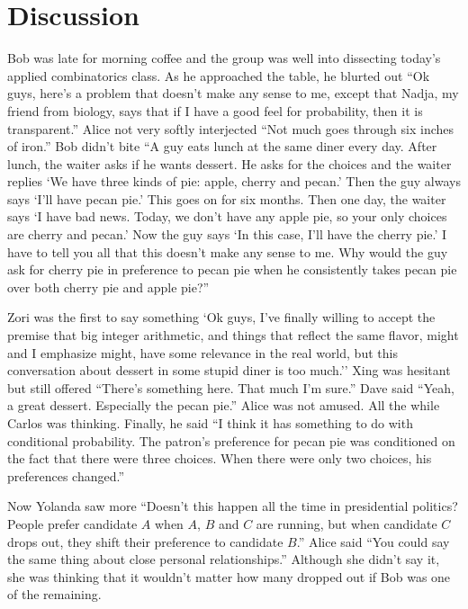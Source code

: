 \section{Discussion}

Bob was late for morning coffee and the group was
well into dissecting today's applied combinatorics class.
As he approached the table, he blurted out
``Ok guys, here's a problem that doesn't make any sense to
me, except that Nadja, my friend from biology, says that if I 
have a good feel for probability, then it is transparent.'' Alice not very
softly interjected ``Not much goes through six inches
of iron.'' Bob didn't bite ``A guy eats lunch
at the same diner every day.  After lunch, the waiter asks
if he wants dessert.  He asks for the choices and the waiter
replies `We have three kinds of pie: apple, cherry and pecan.'
Then the guy always says `I'll have pecan pie.'  This goes
on for six months.  Then one
day, the waiter says `I have bad news.  Today, we don't
have any apple pie, so your only choices are cherry and pecan.'
Now the guy says `In this case, I'll have the cherry pie.'  I
have to tell you all that this doesn't make any sense to me.
Why would the guy ask for cherry pie in preference to pecan
pie when he consistently takes pecan pie over both cherry
pie and apple pie?''

Zori was the first to say something `Ok guys, I've
finally willing to accept the premise that big integer arithmetic,
and things that reflect the same flavor, might and I emphasize
might, have some relevance in the real world, but this conversation
about dessert in some stupid diner is too much.''  Xing was 
hesitant but still offered ``There's something here. That much 
I'm sure.''  Dave said ``Yeah, a great dessert.  Especially 
the pecan pie.''  Alice was not amused.  All the while 
Carlos was thinking. Finally, he said ``I think it has 
something to do with conditional probability.  The patron's 
preference for pecan pie was conditioned on the
fact that there were three choices.  When there were only two
choices, his preferences changed.''

Now Yolanda saw more ``Doesn't this happen all the time in
presidential politics?  People prefer candidate $A$ when
$A$, $B$ and $C$ are running, but when candidate $C$ drops out,
they shift their preference to candidate $B$.''
Alice said ``You could say the same thing about close
personal relationships.''  Although she didn't say it,
she was thinking that it wouldn't matter how many dropped out
if Bob was one of the remaining.


